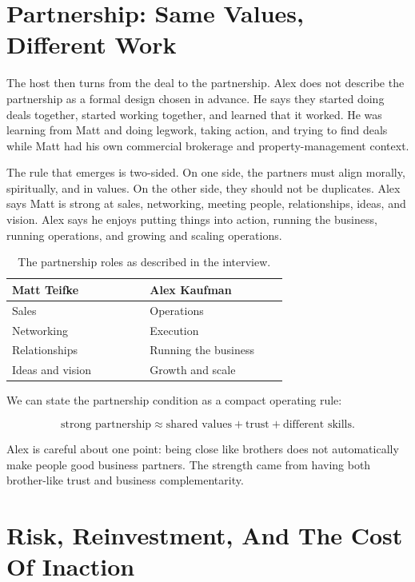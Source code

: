 \section{Partnership: Same Values, Different Work}

The host then turns from the deal to the partnership. Alex does not describe the partnership as a formal design chosen in advance. He says they started doing deals together, started working together, and learned that it worked. He was learning from Matt and doing legwork, taking action, and trying to find deals while Matt had his own commercial brokerage and property-management context.

The rule that emerges is two-sided. On one side, the partners must align morally, spiritually, and in values. On the other side, they should not be duplicates. Alex says Matt is strong at sales, networking, meeting people, relationships, ideas, and vision. Alex says he enjoys putting things into action, running the business, running operations, and growing and scaling operations.

\begin{table}
\centering
\begin{tabular}{|p{0.42\linewidth}|p{0.42\linewidth}|}
\hline
Matt Teifke & Alex Kaufman \\
\hline
Sales & Operations \\
Networking & Execution \\
Relationships & Running the business \\
Ideas and vision & Growth and scale \\
\hline
\end{tabular}
\caption{The partnership roles as described in the interview.}
\end{table}

We can state the partnership condition as a compact operating rule:

\begin{equation}
\text{strong partnership}
\approx
\text{shared values}
+
\text{trust}
+
\text{different skills}.
\end{equation}

Alex is careful about one point: being close like brothers does not automatically make people good business partners. The strength came from having both brother-like trust and business complementarity.

\section{Risk, Reinvestment, And The Cost Of Inaction}

